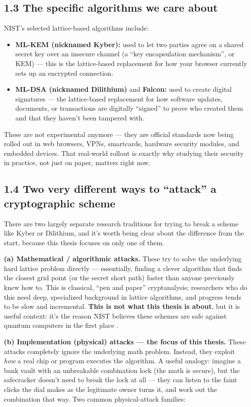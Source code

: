 \documentclass[11pt,a4paper]{article}
\begin{document}
\subsection*{1.3 The specific algorithms we care about}
NIST's selected lattice-based algorithms include:
\begin{itemize}[leftmargin=*]
  \item \textbf{ML-KEM (nicknamed Kyber):} used to let two parties agree on a shared secret key over an insecure channel (a ``key encapsulation mechanism'', or KEM) --- this is the lattice-based replacement for how your browser currently sets up an encrypted connection.
  \item \textbf{ML-DSA (nicknamed Dilithium)} and \textbf{Falcon:} used to create digital signatures --- the lattice-based replacement for how software updates, documents, or transactions are digitally ``signed'' to prove who created them and that they haven't been tampered with.
\end{itemize}
These are not experimental anymore --- they are official standards now being rolled out in web browsers, VPNs, smartcards, hardware security modules, and embedded devices. That real-world rollout is exactly why studying their security in practice, not just on paper, matters right now.

\subsection*{1.4 Two very different ways to ``attack'' a cryptographic scheme}
There are two largely separate research traditions for trying to break a scheme like Kyber or Dilithium, and it's worth being clear about the difference from the start, because this thesis focuses on only one of them.

\textbf{(a) Mathematical / algorithmic attacks.} These try to solve the underlying hard lattice problem directly --- essentially, finding a clever algorithm that finds the closest grid point (or the secret short path) faster than anyone previously knew how to. This is classical, ``pen and paper'' cryptanalysis; researchers who do this need deep, specialized background in lattice algorithms, and progress tends to be slow and incremental. \textbf{This is not what this thesis is about}, but it is useful context: it's the reason NIST believes these schemes are safe against quantum computers in the first place \cite{ducas2025predicting}.

\textbf{(b) Implementation (physical) attacks --- the focus of this thesis.} These attacks completely ignore the underlying math problem. Instead, they exploit \emph{how} a real chip or program executes the algorithm. A useful analogy: imagine a bank vault with an unbreakable combination lock (the math is secure), but the safecracker doesn't need to break the lock at all --- they can listen to the faint clicks the dial makes as the legitimate owner turns it, and work out the combination that way. Two common physical-attack families:
\end{document}
